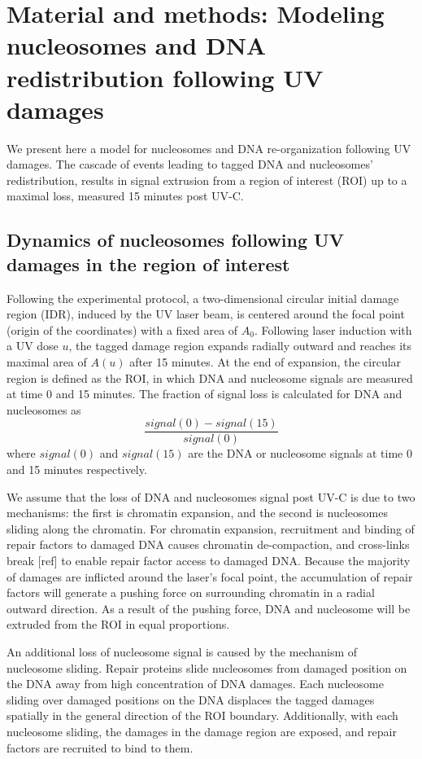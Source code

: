 \documentclass[12pt]{article}
\begin{document}
 \section{Material and methods: Modeling nucleosomes and DNA redistribution following UV damages} 
	
	We present here a model for nucleosomes and DNA re-organization following
	UV damages. The cascade of events leading to tagged DNA and nucleosomes'
	redistribution, results in signal extrusion from a region of interest (ROI) up
	to a maximal loss, measured 15 minutes post UV-C.
	
	\subsection{Dynamics of nucleosomes following UV damages in the region of interest}
	
	Following the experimental protocol, a two-dimensional circular initial damage region (IDR), induced by the UV laser beam, is centered around the focal point (origin of the coordinates) with a fixed area of $A_0$. Following
	laser induction with a UV dose $u$, the tagged damage region expands radially outward and reaches its maximal area of $A(u)$ after 15 minutes. At the end of expansion, the circular region is defined
	as the ROI, in which DNA and nucleosome signals are measured at
	time 0 and 15 minutes. The fraction of signal loss is calculated for DNA and nucleosomes as
	\begin{equation}
	\frac{signal(0)-signal(15)}{signal(0)}
	\end{equation}	
	where $signal(0)$ and $signal(15)$ are the DNA or nucleosome signals at time 0 and 15 minutes respectively. 
	
	We assume that the loss of DNA and nucleosomes signal post UV-C is due
	to two mechanisms: the first is chromatin expansion, and the second is nucleosomes sliding along the chromatin. For chromatin expansion, recruitment and
	binding of repair factors to damaged DNA causes chromatin de-compaction, and cross-links break [ref] to enable repair factor access to damaged DNA. Because the majority of damages are inflicted around the laser's focal point, the accumulation of repair factors will generate a pushing force on surrounding chromatin in a radial outward direction. As a result of the pushing force, DNA and nucleosome will be extruded from the ROI in equal proportions. 
	
	An additional loss of nucleosome signal is caused by the mechanism of nucleosome sliding. Repair proteins slide nucleosomes from damaged position on the DNA away from high concentration of DNA damages. Each nucleosome sliding over damaged positions on the DNA displaces the tagged damages spatially in the general direction of the ROI boundary. Additionally, with each nucleosome sliding, the damages in the damage region are exposed, and repair factors are recruited to bind to them.   
\end{document}
